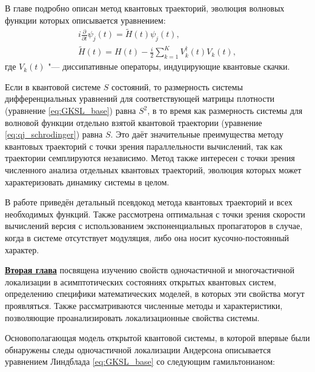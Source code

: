 В главе подробно описан метод квантовых траекторий, эволюция волновых функции которых описывается уравнением:
\begin{equation}
	\label{eq:qj_schrodinger}
	\begin{gathered}
		i \frac{\partial}{\partial t} \psi_j(t) = \tilde{H}(t) \psi_j(t), \\
		\tilde{H}(t) = H(t) - \frac{i}{2} \sum_{k=1}^{K} V_k^\dagger(t) V_k(t),
	\end{gathered}
\end{equation}
где \(V_k(t)\) "--- диссипативные операторы, индуцирующие квантовые скачки.

Если в квантовой системе $S$ состояний, то размерность системы дифференциальных уравнений для соответствующей матрицы плотности (уравнение \cref{eq:GKSL_base}) равна $S^2$, в то время как размерность системы для волновой функции отдельно взятой квантовой траектории (уравнение \cref{eq:qj_schrodinger}) равна $S$. 
Это даёт значительные преимущества методу квантовых траекторий с точки зрения параллельности вычислений, так как траектории семплируются независимо. 
Метод также интересен с точки зрения численного анализа отдельных квантовых траекторий, эволюция которых может характеризовать динамику системы в целом. 

В работе приведён детальный псевдокод метода квантовых траекторий и всех необходимых функций. Также рассмотрена оптимальная с точки зрения скорости вычислений версия с использованием экспоненциальных пропагаторов в случае, когда в системе отсутствует модуляция, либо она носит кусочно-постоянный характер.

\underline{\textbf{Вторая глава}} посвящена изучению свойств одночастичной и многочастичной локализации в асимптотических состояниях открытых квантовых систем, определению специфики математических моделей, в которых эти свойства могут проявляться.
Также рассматриваются численные методы и характеристики, позволяющие проанализировать локализационные свойства системы. 

Основополагающая модель открытой квантовой системы, в которой впервые были обнаружены следы одночастичной локализации Андерсона \cite{Yusipov2017} описывается уравнением Линдблада \cref{eq:GKSL_base} со следующим гамильтонианом:

